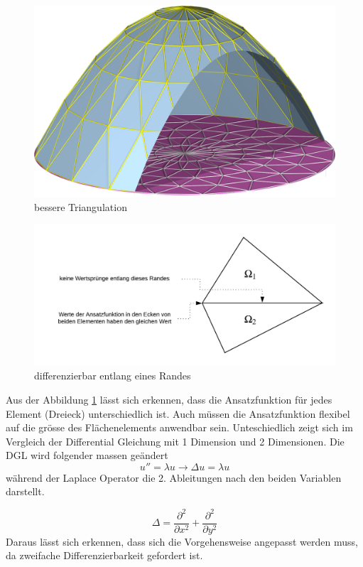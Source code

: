\begin{figure}[h!]
	\centering
	\includegraphics[scale=0.8]{papers/fem/Images/polar.jpg}
	\caption{bessere Triangulation}
	\label{fig:besser Approx}
\end{figure}
\begin{figure}[h]
	\centering
	\includegraphics[scale=0.8]{papers/fem/Images/Rand.jpeg}
	\caption{differenzierbar entlang eines Randes}
	\label{fig:Randbedingung}
\end{figure}
Aus der Abbildung \ref{fig:besser Approx} lässt sich erkennen, dass die Ansatzfunktion für jedes Element (Dreieck) unterschiedlich ist. Auch müssen die Ansatzfunktion flexibel auf die grösse des Flächenelements anwendbar sein.
Unteschiedlich zeigt sich im Vergleich der Differential Gleichung mit 1 Dimension und 2 Dimensionen. Die DGL wird folgender massen geändert 
\begin{equation}
	u'' = \lambda u \rightarrow \Delta u = \lambda u 
	\label{fem:DGL2D}
\end{equation} 
während der Laplace Operator die 2. Ableitungen nach den beiden Variablen darstellt.

\begin{equation}
	\Delta = \frac{\partial ^2}{\partial x^2} + \frac{\partial ^2}{\partial y^2}
\end{equation} 
Daraus lässt sich erkennen, dass sich die Vorgehensweise angepasst werden muss, da zweifache Differenzierbarkeit gefordert ist. %

